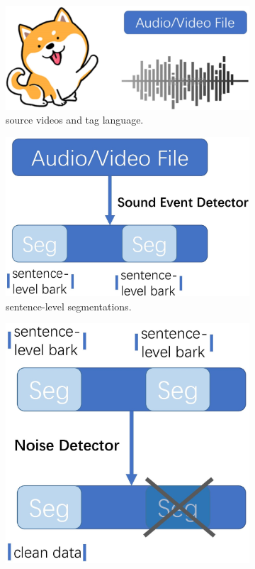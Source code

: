 \begin{figure}[ht]
	\centering
\begin{subfigure}[t]{0.48\columnwidth}
        \centering
        \includegraphics[width=0.98\columnwidth]{images/image0.jpg}
        \caption{source videos and tag language.}
        \label{fig:source}
\end{subfigure}
\begin{subfigure}[t]{0.48\columnwidth}
        \centering
        \includegraphics[width=0.7\columnwidth]{images/image1.jpg}
	\caption{sentence-level segmentations.}
        \label{fig:sentence}
\end{subfigure}
\begin{subfigure}[t]{0.48\columnwidth}
        \centering
        \includegraphics[width=0.7\columnwidth]{images/image2.jpg}

\end{subfigure}
\end{figure}
